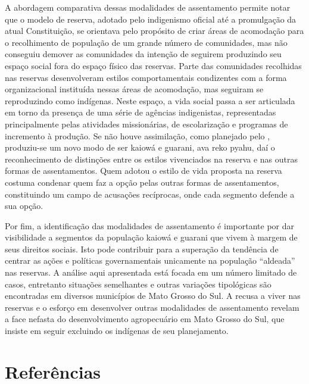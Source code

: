 A abordagem comparativa dessas modalidades de assentamento permite notar
que o modelo de reserva, adotado pelo indigenismo oficial até a
promulgação da atual Constituição, se orientava pelo propósito de criar
áreas de acomodação para o recolhimento de população de um grande
número de comunidades, mas não conseguiu demover as comunidades da
intenção de seguirem produzindo seu espaço social fora do espaço físico
das reservas. Parte das comunidades recolhidas nas reservas
desenvolveram estilos comportamentais condizentes com a forma
organizacional instituída nessas áreas de acomodação, mas seguiram se
reproduzindo como indígenas. Neste espaço, a vida social passa a ser
articulada em torno da presença de uma série de agências indigenistas,
representadas principalmente pelas atividades missionárias, de
escolarização e programas de incremento à produção. Se não houve
assimilação, como planejado pelo , produziu-se um novo modo de ser
kaiowá e guarani, ava reko pyahu, daí o reconhecimento de distinções
entre os estilos vivenciados na reserva e nas outras formas de
assentamentos. Quem adotou o estilo de vida proposta na reserva costuma
condenar quem faz a opção pelas outras formas de assentamentos,
constituindo um campo de acusações recíprocas, onde cada segmento
defende a sua opção.

Por fim, a identificação das modalidades de assentamento é importante
por dar visibilidade a segmentos da população kaiowá e guarani que
vivem à margem de seus direitos sociais. Isto pode contribuir para a
superação da tendência de centrar as ações e políticas governamentais
unicamente na população ``aldeada'' nas reservas. A análise aqui
apresentada está focada em um número limitado de casos, entretanto
situações semelhantes e outras variações tipológicas são encontradas em
diversos municípios de Mato Grosso do Sul. A recusa a viver nas
reservas e o esforço em desenvolver outras modalidades de assentamento
revelam a face nefasta do desenvolvimento agropecuário em Mato Grosso
do Sul, que insiste em seguir excluindo os indígenas de seu
planejamento.

\section{Referências}

